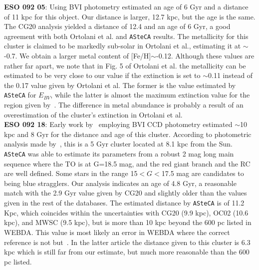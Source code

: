 \documentclass[referee]{aa}
\begin{document}
\begin{appendix}
  \noindent \textbf{ESO 092 05}: Using BVI photometry \cite{Ortolani_2008} estimated
  an age of 6 Gyr and a distance of 11 kpc for this object. Our distance is
  larger, 12.7 kpc, but the age is the same.
  The CG20 analysis yielded a distance of 12.4 and an age of 6 Gyr, a good
  agreement with both Ortolani et al. and \texttt{ASteCA} results.
  The metallicity for this cluster is claimed to be markedly sub-solar in
  Ortolani et al., estimating it at $\sim$-0.7. We obtain a
  larger metal content of [Fe/H]$\sim$-0.12. Although these values are rather far
  apart, we note that in Fig. 5 of Ortolani et al. the metallicity can be
  estimated to be very close to our value if the extinction is set to
  $\sim$0.11 instead of the 0.17 value given by Ortolani et al. The former is
  the value estimated by \texttt{ASteCA} for $E_{BV}$, while the latter
  is almost the maximum extinction value for the region given
  by~\cite{Schlafly_2011}. The difference in metal abundance is probably a
  result of an overestimation of the cluster's extinction in Ortolani et al.\\

  \noindent \textbf{ESO 092 18}: Early work by~\cite{Kubiak_1991} employing BVI CCD
  photometry estimated $\sim$10 kpc and 8 Gyr for the distance and age of this
  cluster.
  According to photometric analysis made by~\cite{Carraro1995}, this is a 5 Gyr
  cluster located at 8.1 kpc from the Sun.
  \texttt{ASteCA} was able to estimate its parameters from a robust 2 mag long
  main sequence where the TO is at G=18.5 mag, and the red giant branch and the
  RC are well defined. Some stars in the range 15$<G<$17.5 mag are candidates to
  being blue stragglers.
  Our analysis indicates an age of 4.8 Gyr, a reasonable match with the 2.9 Gyr
  value given by CG20 and slightly older than the values given in the rest of
  the databases. The estimated distance by \texttt{ASteCA} is of 11.2 Kpc, which
  coincides within the uncertainties with CG20 (9.9 kpc), OC02 (10.6 kpc), and
  MWSC (9.5 kpc), but is more than 10 kpc beyond the 600 pc listed in WEBDA.
  This value is most likely an error in WEBDA where the correct reference is
  not \cite{Phelps_1994_develop} but~\cite{Janes_1994}. In the latter article
  the distance given to this cluster is 6.3 kpc which is still far from our
  estimate, but much more reasonable than the 600 pc listed.\\


\end{appendix}
\end{document}
